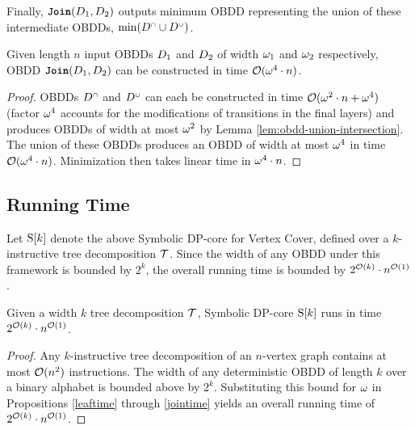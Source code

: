 Finally, $\texttt{\textbf{Join}}(D_1,D_2)$ outputs minimum OBDD representing the union of these intermediate OBDDs, $\mathrm{min}(D^{{\scriptscriptstyle\cap}} \cup D^{{\scriptscriptstyle\cup}})$.

\begin{proposition}\label{jointime}
    Given length $n$ input OBDDs $D_1$ and $D_2$ of width $\omega_1$ and $\omega_2$ respectively, OBDD $\texttt{\textbf{Join}}(D_1, D_2)$ can be constructed in time ${\mathcal{O}(\omega^4\cdot n)}$. 
\end{proposition}
\begin{proof}
    OBDDs $D^{{\scriptscriptstyle\cap}} $ and $D^{{\scriptscriptstyle\cup}}$ can each be constructed in time $\mathcal{O}(\omega^2\cdot n + \omega^4)$ (factor $\omega^4$ accounts for the modifications of transitions in the final layers) and produces OBDDs of width at most $\omega^2$ by Lemma \ref{lem:obdd-union-intersection}. The union of these OBDDs produces an OBDD of width at most $\omega^4$ in time $\mathcal{O}(\omega^4\cdot n)$. Minimization then takes linear time in $\omega^4\cdot n$.
\end{proof}


\subsection{Running Time}

Let $\mathrm{S}[k]$ denote the above Symbolic DP-core for {\sc Vertex Cover},
defined over a $k$-instructive tree decomposition $\mathcal{T}$. Since the width
of any OBDD under this framework is bounded by $2^k$, the overall running time
is bounded by $2^{\mathcal{O}(k)} \cdot n^{\mathcal{O}(1)}$.

\begin{proposition}
    Given a width $k$ tree decomposition $\mathcal{T}$, Symbolic DP-core $\mathrm{S}[k]$ runs in time $2^{\mathcal{O}(k)}\cdot n^{\mathcal{O}(1)}$.
\end{proposition}
\begin{proof}
   Any $k$-instructive tree decomposition of an $n$-vertex graph contains at most
$\mathcal{O}(n^2)$ instructions. The width of any deterministic OBDD of length $k$
over a binary alphabet is bounded above by $2^k$. Substituting this bound for
$\omega$ in Propositions \ref{leaftime} through \ref{jointime} yields an overall running time of
$2^{\mathcal{O}(k)} \cdot n^{\mathcal{O}(1)}$.
\end{proof}